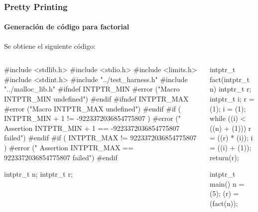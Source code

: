 \begin{frame}[fragile]
\frametitle{Pretty Printing}
\framesubtitle{Generación de código para factorial}
\Fontvi

Se obtiene el siguiente código:

\begin{columns}[t]
\begin{semiverbatim}
\alert<2>{#include <stdlib.h>}
\alert<2>{#include <stdio.h>}
\alert<2>{#include <limits.h>}
\alert<2>{#include <stdint.h>}
\alert<2>{#include "../test_harness.h"}
\alert<2>{#include "../malloc_lib.h"}
\alert<3>{#ifndef INTPTR_MIN}
  \alert<3>{#error ("Macro INTPTR_MIN undefined")}
\alert<3>{#endif}
\alert<3>{#ifndef INTPTR_MAX}
  \alert<3>{#error ("Macro INTPTR_MAX undefined")}
\alert<3>{#endif}
\alert<3>{#if ( INTPTR_MIN + 1 != -9223372036854775807 )}
  \alert<3>{#error (" Assertion INTPTR_MIN + 1 == -9223372036854775807 failed")}
\alert<3>{#endif}
\alert<3>{#if ( INTPTR_MAX != 9223372036854775807 )}
  \alert<3>{#error (" Assertion INTPTR_MAX == 9223372036854775807 failed")}
\alert<3>{#endif}


\alert<4>{intptr_t n;}
\alert<4>{intptr_t r;}
\end{semiverbatim}
\begin{semiverbatim}
\alert<5>{intptr_t fact(intptr_t n) {}
\alert<5>{  intptr_t r;}
\alert<5>{  intptr_t i;}
\alert<5>{  r = (1);}
\alert<5>{  i = (1);}
\alert<5>{  while ((i) < ((n) + (1))) {}
\alert<5>{    r = ((r) * (i));}
\alert<5>{    i = ((i) + (1));}
\alert<5>{  }}
\alert<5>{  return(r);}
\alert<5>{}}

\alert<6>{intptr_t main() {}
\alert<6>{  n = (5);}
\alert<6>{  (r) = (fact(n));}
\alert<6>{}}
\end{semiverbatim}
\end{columns}


\end{frame}


